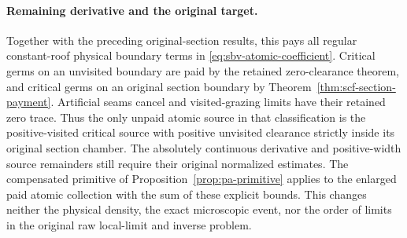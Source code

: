 \paragraph{Remaining derivative and the original target.}
Together with the preceding original-section results, this pays
all regular constant-roof physical boundary terms in
\eqref{eq:sbv-atomic-coefficient}. Critical germs on an unvisited
boundary are paid by the retained zero-clearance theorem, and
critical germs on an original section boundary by
Theorem~\ref{thm:scf-section-payment}. Artificial seams cancel
and visited-grazing limits have their retained zero trace.
Thus the only unpaid atomic source in that classification is
the positive-visited critical source with positive unvisited
clearance strictly inside its original section chamber.
The absolutely continuous derivative and positive-width source
remainders still require their original normalized estimates.
The compensated primitive of Proposition~\ref{prop:pa-primitive}
applies to the enlarged paid atomic collection with the sum of
these explicit bounds. This changes neither the physical density,
the exact microscopic event, nor the order of limits in the
original raw local-limit and inverse problem.
